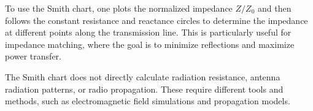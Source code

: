 To use the Smith chart, one plots the normalized impedance \(Z/Z_0\) and then follows the constant resistance and reactance circles to determine the impedance at different points along the transmission line. This is particularly useful for impedance matching, where the goal is to minimize reflections and maximize power transfer.

The Smith chart does not directly calculate radiation resistance, antenna radiation patterns, or radio propagation. These require different tools and methods, such as electromagnetic field simulations and propagation models.

